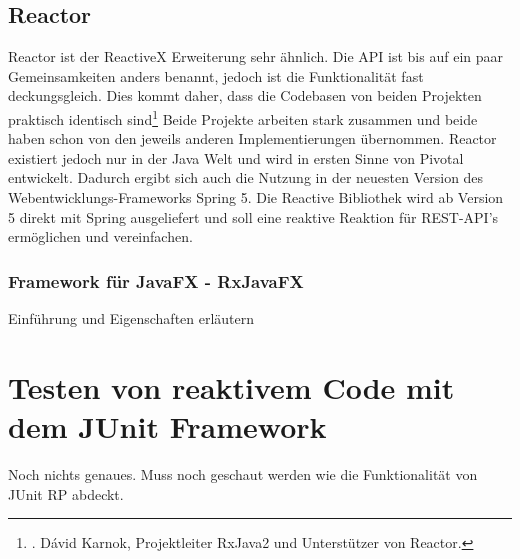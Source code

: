 \subsection{Reactor}
Reactor ist der ReactiveX Erweiterung sehr ähnlich. Die API ist bis auf ein paar Gemeinsamkeiten anders benannt, jedoch ist die Funktionalität fast deckungsgleich. Dies kommt daher, dass die Codebasen von beiden Projekten praktisch identisch sind\footnote{\cite{Karnok.2016}. Dávid Karnok, Projektleiter RxJava2 und Unterstützer von Reactor.} Beide Projekte arbeiten stark zusammen und beide haben schon von den jeweils anderen Implementierungen übernommen. Reactor existiert jedoch nur in der Java Welt und wird in ersten Sinne von Pivotal entwickelt. Dadurch ergibt sich auch die Nutzung in der neuesten Version des Webentwicklungs-Frameworks Spring 5. Die Reactive Bibliothek wird ab Version 5 direkt mit Spring ausgeliefert und soll eine reaktive Reaktion für REST-API's ermöglichen und vereinfachen. 
\subsubsection{Framework für JavaFX - RxJavaFX}
Einführung und Eigenschaften erläutern
\section{Testen von reaktivem Code mit dem JUnit Framework}
Noch nichts genaues. Muss noch geschaut werden wie die Funktionalität von JUnit RP abdeckt.